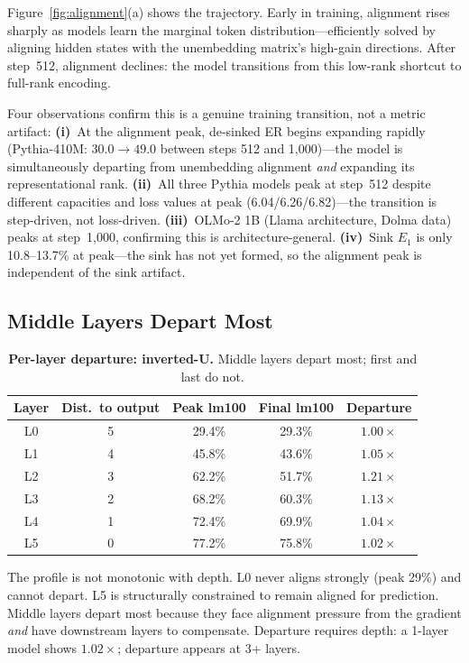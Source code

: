 \documentclass[11pt]{article}
\begin{document}
Figure~\ref{fig:alignment}(a) shows the trajectory.
Early in training, alignment rises sharply as models learn the marginal token distribution---efficiently solved by aligning hidden states with the unembedding matrix's high-gain directions.
After step~512, alignment declines: the model transitions from this low-rank shortcut to full-rank encoding.

Four observations confirm this is a genuine training transition, not a metric artifact:
\textbf{(i)}~At the alignment peak, de-sinked ER begins expanding rapidly (Pythia-410M: $30.0 \to 49.0$ between steps 512 and 1{,}000)---the model is simultaneously departing from unembedding alignment \emph{and} expanding its representational rank.
\textbf{(ii)}~All three Pythia models peak at step~512 despite different capacities and loss values at peak (6.04/6.26/6.82)---the transition is step-driven, not loss-driven.
\textbf{(iii)}~OLMo-2 1B (Llama architecture, Dolma data) peaks at step~1{,}000, confirming this is architecture-general.
\textbf{(iv)}~Sink $E_1$ is only 10.8--13.7\% at peak---the sink has not yet formed, so the alignment peak is independent of the sink artifact.

\subsection{Middle Layers Depart Most}\label{sec:inverted}

\begin{table}[t]
\centering
\caption{\textbf{Per-layer departure: inverted-U.} Middle layers depart most; first and last do not.}
\label{tab:inverted}
\small
\begin{tabular}{@{}ccccc@{}}
\toprule
\textbf{Layer} & \textbf{Dist.\ to output} & \textbf{Peak lm100} & \textbf{Final lm100} & \textbf{Departure} \\
\midrule
L0 & 5 & 29.4\% & 29.3\% & $1.00\times$ \\
L1 & 4 & 45.8\% & 43.6\% & $1.05\times$ \\
L2 & 3 & 62.2\% & 51.7\% & $\mathbf{1.21\times}$ \\
L3 & 2 & 68.2\% & 60.3\% & $1.13\times$ \\
L4 & 1 & 72.4\% & 69.9\% & $1.04\times$ \\
L5 & 0 & 77.2\% & 75.8\% & $1.02\times$ \\
\bottomrule
\end{tabular}
\end{table}

The profile is not monotonic with depth.
L0 never aligns strongly (peak 29\%) and cannot depart.
L5 is structurally constrained to remain aligned for prediction.
Middle layers depart most because they face alignment pressure from the gradient \emph{and} have downstream layers to compensate.
Departure requires depth: a 1-layer model shows $1.02\times$; departure appears at 3+ layers.
\end{document}
